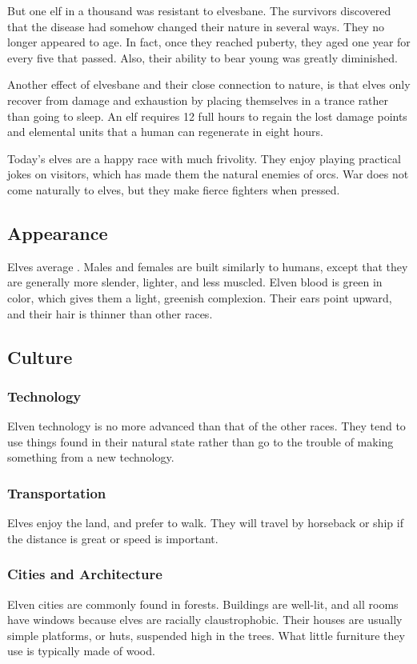 \begin{multicols*}{2}
But one elf in a thousand was resistant to elvesbane.
The survivors discovered that the disease had somehow changed their nature in several ways. They no longer appeared to age. In fact, once they reached puberty, they aged one year for every five that passed. Also, their ability to bear young was greatly diminished.

Another effect of elvesbane and their close connection to nature, is that elves only recover from damage and exhaustion by placing themselves in a trance rather than going to sleep. An elf requires 12 full hours to regain the lost damage points and elemental units that a human can regenerate in eight hours.

Today's elves are a happy race with much frivolity. They enjoy playing practical jokes on visitors, which has made them the natural enemies of orcs. War does not come naturally to elves, but they make fierce fighters when pressed.
\subsection{Appearance}
Elves average . Males and females are built similarly to humans, except that they are generally more slender, lighter, and less muscled. Elven blood is green in color, which gives them a light, greenish complexion. Their ears point upward, and their hair is thinner than other races.
\subsection{Culture}
\subsubsection{Technology}
Elven technology is no more advanced than that of the other races. They tend to use things found in their natural state rather than go to the trouble of making something from a
new technology.
\subsubsection{Transportation}
Elves enjoy the land, and prefer to walk. They will travel by horseback or ship if the distance is great or speed is important.
\subsubsection{Cities and Architecture}
Elven cities are commonly found in forests. Buildings are well-lit, and all rooms have windows because elves are racially claustrophobic. Their houses are usually simple platforms, or huts, suspended high in the trees. What little furniture they use is typically made of wood.

\end{multicols*}
